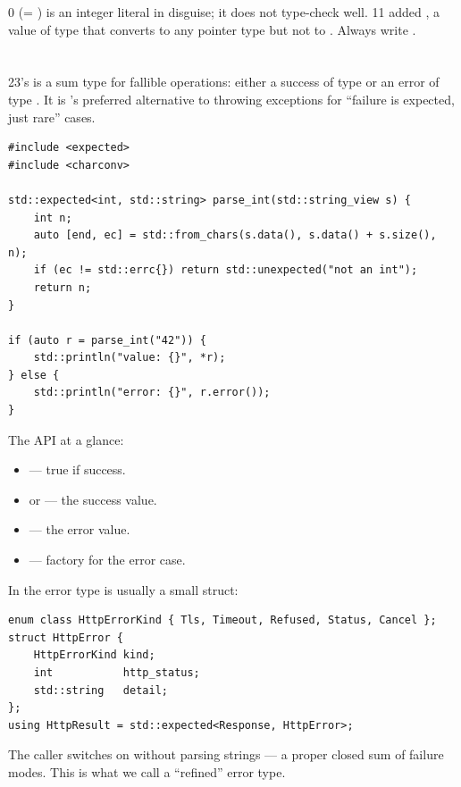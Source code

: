 \cpp{} 0 (= ) is an integer literal in disguise; it does
not type-check well. \cpp{}11 added , a value of type
 that converts to any pointer type but not to
. Always write .

\section{}
\label{sec:cpp:expected}

\cpp{}23's  is a sum type for fallible
operations: either a success of type  or an error of type
. It is \maya{}'s preferred alternative to throwing
exceptions for ``failure is expected, just rare'' cases.

\begin{lstlisting}
#include <expected>
#include <charconv>

std::expected<int, std::string> parse_int(std::string_view s) {
    int n;
    auto [end, ec] = std::from_chars(s.data(), s.data() + s.size(), n);
    if (ec != std::errc{}) return std::unexpected("not an int");
    return n;
}

if (auto r = parse_int("42")) {
    std::println("value: {}", *r);
} else {
    std::println("error: {}", r.error());
}
\end{lstlisting}

The API at a glance:

\begin{itemize}[leftmargin=*]
  \item {} --- true if success.
  \item {} or  --- the success value.
  \item {} --- the error value.
  \item {} --- factory for the error case.
\end{itemize}

In \maya{} the error type is usually a small struct:

\begin{lstlisting}
enum class HttpErrorKind { Tls, Timeout, Refused, Status, Cancel };
struct HttpError {
    HttpErrorKind kind;
    int           http_status;
    std::string   detail;
};
using HttpResult = std::expected<Response, HttpError>;
\end{lstlisting}

The caller switches on  without parsing strings --- a
proper closed sum of failure modes. This is what we call a
``refined'' error type.

